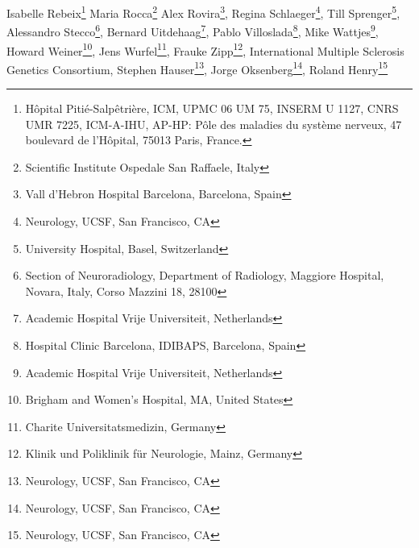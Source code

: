 Isabelle Rebeix\footnote[9]{Hôpital Pitié-Salpêtrière, ICM, UPMC 06 UM 75, INSERM U 1127, CNRS UMR 7225, ICM-A-IHU, AP-HP:  
Pôle des maladies du système nerveux, 47 boulevard de l'Hôpital, 75013  
Paris, France.}
Maria Rocca\footnote[8]{Scientific Institute Ospedale San Raffaele, Italy}
Alex Rovira\footnote[5]{Vall d’Hebron Hospital Barcelona, Barcelona, Spain},
Regina Schlaeger\footnote[1]{Neurology, UCSF, San Francisco, CA},
Till Sprenger\footnote[13]{University Hospital, Basel, Switzerland},
Alessandro Stecco\footnote[6]{Section of Neuroradiology, Department of Radiology, Maggiore Hospital, Novara, Italy, Corso Mazzini 18, 28100},
Bernard Uitdehaag\footnote[16]{Academic Hospital Vrije Universiteit, Netherlands},
Pablo Villoslada\footnote[14]{Hospital Clinic Barcelona, IDIBAPS, Barcelona, Spain},
Mike Wattjes\footnote[16]{Academic Hospital Vrije Universiteit, Netherlands},
Howard Weiner\footnote[4]{Brigham and Women's Hospital, MA, United States},
Jens Wurfel\footnote[2]{Charite Universitatsmedizin, Germany},
Frauke Zipp\footnote[10]{Klinik und Poliklinik für Neurologie, Mainz, Germany},
International Multiple Sclerosis Genetics Consortium,
Stephen Hauser\footnote[1]{Neurology, UCSF, San Francisco, CA},
Jorge Oksenberg\footnote[1]{Neurology, UCSF, San Francisco, CA},
Roland Henry\footnote[1]{Neurology, UCSF, San Francisco, CA}

\else %
\author[1]{Anisha Keshavan}
\author[2]{Friedmann Paul}
\author[3]{Mona K. Beyer}
\author[1]{Alyssa Zhu}
\author[1]{Nico Papinutto}
\author[1]{William Stern}
\author[13]{Michael Aman}
\author[4]{Rohit Bakshi}
\author[1]{Antje Bischof}
\author[6] {Alessandro Carriero}
\author[5]{Manuel Comabella}
\author[1]{Jason Crane}
\author[6]{Sandra D’Alfonso}
\author[7]{Benedicte Dubois}
\author[8]{Massimo Filippi}
\author[9]{Bertrand Fontaine}
\author[7]{Ann Goris}
\author[13]{Laura Gaetano}
\author[10]{Sergiu Groppa}
\author[11]{David Hafler}
\author[3]{Hanne F. Harbo}
\author[12]{Bernhard Hemmer}
\author[1]{Kesshi Jordan}
\author[13]{Ludwig Kappos}
\author[1]{Gina Kirkish}
\author[14]{Sara Llufriu}
\author[13]{Stefano Magon}
\author[8]{Filippo Martinelli-Boneschi}
\author[15]{Jacob McCauley}
\author[5]{Xavier Montalban}
\author[12]{Mark Muhlau}
\author[11]{Daniel Pelletier} %
\author[15]{Margaret Pericak-Vance}
\author[9]{Isabelle Rebeix}
\author[8]{Maria Rocca}
\author[5]{Alex Rovira}
\author[1]{Regina Schlaeger}
\author[13]{Till Sprenger} %
\author[6]{Alessandro Stecco}
\author[16]{Bernard Uitdehaag}
\author[14]{Pablo Villoslada}
\author[13]{Mike Wattjes}
\author[4]{Howard Weiner}
\author[2]{Jens Wurfel}
\author[10]{Frauke Zipp}
\author[17]{International Multiple Sclerosis Genetics Consortium}
\author[1]{Stephen Hauser}
\author[1]{Jorge Oksenberg}
\author[1]{Roland Henry}

